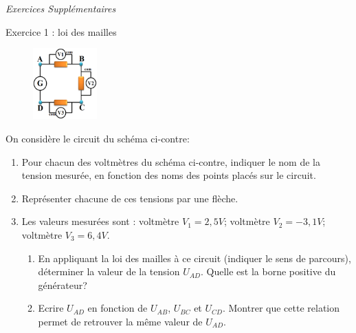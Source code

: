 \documentclass[12pt, french]{article}
\begin{document}
\begin{center}
\end{center}
\begin{center}
   \Large{ \em{Exercices Supplémentaires}}
\end{center}

   \begin{Box2}{Exercice 1 : loi des mailles }

\begin{figure}

	\vspace{-0.8cm}
  \begin{center}
	\includegraphics[width=0.22\textwidth]{./img/ex00.png}
  \end{center}
\end{figure}

	On considère le circuit du schéma ci-contre:
	\begin{enumerate}

		\item Pour chacun des voltmètres du schéma ci-contre, indiquer le nom de la
tension mesurée, en fonction des noms des points placés sur le circuit.
\item  Représenter chacune de ces tensions par une flèche.

\item Les valeurs mesurées sont : voltmètre $V_1= 2,5V$; voltmètre $V_2= -3,1V$; voltmètre $V_3= 6,4V$.
	\begin{enumerate}
		\item En appliquant la loi des mailles à ce circuit (indiquer le sens de
		parcours), déterminer la valeur de la tension $U_{AD}$. Quelle est la borne
positive du générateur?

\item  Ecrire $U_{AD}$ en fonction de $U_{AB}$, $U_{BC}$ et $U_{CD}$. Montrer que cette relation
	permet de retrouver la même valeur de $U_{AD}$.
		

\end{enumerate}
	\end{enumerate}
   \end{Box2}
\end{document}
